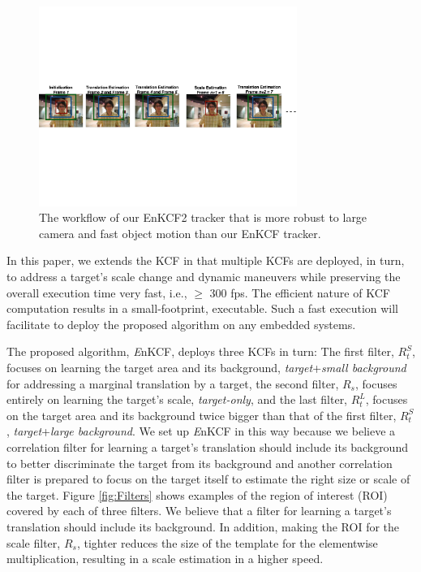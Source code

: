 \documentclass{bmvc2k}
\begin{document}
\begin{figure}[!t]
\centering
\includegraphics[width=0.75\textwidth]{figures/Workflow_EnKCF2+PF.pdf}
\caption{The workflow of our EnKCF2 tracker that is more robust to large camera and fast object motion than our EnKCF tracker.}
\label{Workflow_figure_EnKCF2}
\end{figure}

In this paper, we extends the KCF in that multiple KCFs are deployed,
in turn, to address a target's scale change and dynamic maneuvers
while preserving the overall execution time very fast, i.e., $\ge$ 300
fps. The efficient nature of KCF computation results in a
small-footprint, executable. Such a fast execution will facilitate to
deploy the proposed algorithm on any embedded systems.

The proposed algorithm, {\it E}nKCF, deploys three KCFs in turn: The
first filter, $R_{t}^{S}$, focuses on learning the target area and its
background, \textit{target}+\textit{small background} for addressing a
marginal translation by a target, the second filter, $R_{s}$, focuses
entirely on learning the target's scale, \textit{target-only}, and the
last filter, $R_{t}^{L}$, focuses on the target area and its
background twice bigger than that of the first filter, $R_{t}^{S}$,
\textit{target}+\textit{large background}. We set up {\it E}nKCF in
this way because we believe a correlation filter for learning a
target's translation should include its background to better
discriminate the target from its background and another correlation
filter is prepared to focus on the target itself to estimate the right
size or scale of the target. Figure \ref{fig:Filters} shows examples
of the region of interest (ROI) covered by each of three filters. We
believe that a filter for learning a target's translation should
include its background. In addition, making the ROI for the scale
filter, $R_{s}$, tighter reduces the size of the template for the
elementwise multiplication, resulting in a scale estimation in a
higher speed.
\end{document}
